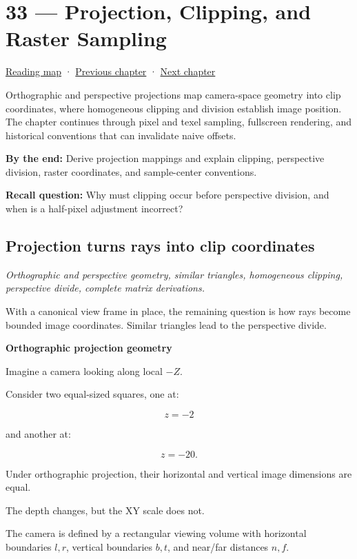 \hypertarget{02-foundations-ii-ch033}{}
\chapter{33 --- Projection, Clipping, and Raster Sampling}\label{02-foundations-ii-ch033-projection-clipping-and-raster-sampling}

\hyperref[volume-reading-map]{Reading map} · \hyperref[02-foundations-ii-ch032]{Previous chapter} · \hyperref[02-foundations-ii-ch034]{Next chapter}

Orthographic and perspective projections map camera-space geometry into clip coordinates, where homogeneous clipping and division establish image position. The chapter continues through pixel and texel sampling, fullscreen rendering, and historical conventions that can invalidate naive offsets.

\textbf{By the end:} Derive projection mappings and explain clipping, perspective division, raster coordinates, and sample-center conventions.

\textbf{Recall question:} Why must clipping occur before perspective division, and when is a half-pixel adjustment incorrect?

\section{Projection turns rays into clip coordinates}\label{02-foundations-ii-ch033-projection-turns-rays-into-clip-coordinates}

\emph{Orthographic and perspective geometry, similar triangles, homogeneous clipping, perspective divide, complete matrix derivations.}

With a canonical view frame in place, the remaining question is how rays become bounded image coordinates. Similar triangles lead to the perspective divide.

\textbf{Orthographic projection geometry}

Imagine a camera looking along local \(-Z\).

Consider two equal-sized squares, one at:

\[
 z=-2
\]

and another at:

\[
 z=-20.
\]

Under orthographic projection, their horizontal and vertical image dimensions are equal.

The depth changes, but the XY scale does not.

The camera is defined by a rectangular viewing volume with horizontal boundaries \(l,r\), vertical boundaries \(b,t\), and near/far distances \(n,f\).

